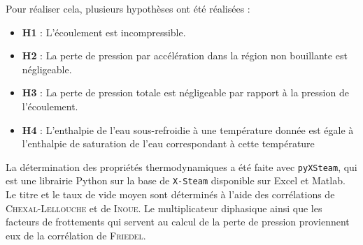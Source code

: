 Pour réaliser cela, plusieurs hypothèses ont été réalisées :
\begin{itemize}
    \item \textbf{H1} : L'écoulement est incompressible.
    \item \textbf{H2} : La perte de pression par accélération dans la région non bouillante est négligeable.
    \item \textbf{H3} : La perte de pression totale est négligeable par rapport à la pression de l'écoulement.
    \item \textbf{H4} : L'enthalpie de l'eau sous-refroidie à une température donnée est égale à l'enthalpie de saturation de l'eau correspondant à cette température
\end{itemize}
\vspace{12pt}
\par
La détermination des propriétés thermodynamiques a été faite avec \texttt{pyXSteam}, qui est une librairie Python sur la base de \texttt{X-Steam} disponible sur Excel et Matlab.\\

Le titre et le taux de vide moyen sont déterminés à l'aide des corrélations de \textsc{Chexal-Lellouche} et de \textsc{Inoue}. Le multiplicateur diphasique ainsi que les facteurs de frottements qui servent au calcul de la perte de pression proviennent eux de la corrélation de \textsc{Friedel}.\\ \par





